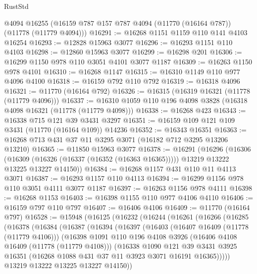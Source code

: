 \begin{lexlean}{RustStd}
\begin{coremodule}
    @4094
    @16255
    (@16159 @787 @157 @787 @4094 (@11770 (@16164 @787)) (@11778 (@11779 @4094)))
@16291 := @16268 @1151 @1159 @110 @141 @4103 @16254
@16293 := @12828 @15963 @3077
@16296 := @16293 @1151 @110 @4103
@16298 := @12860 @15963 @3077
@16299 := @16298 @201
@16306 := @16299 @1150 @978 @110 @3051 @4101 @3077 @1187
@16309 := @16263 @1150 @978 @4101
@16310 := @16268 @1147
@16315 := @16310 @1149 @110 @977 @4096 @4100
@16318 := @16159 @792 @110 @792
@16319 := @16318 @4096
@16321 := @11770 (@16164 @792)
@16326 := @16315 (@16319 @16321 (@11778 (@11779 @4096)))
@16337 := @16310 @1059 @110 @196 @4098 @3828 (@16318 @4098 @16321 (@11778 (@11779 @4098)))
@16338 := @16268 @423
@16343 := @16338 @715 @121 @39 @3431 @3297
@16351 := @16159 @109 @121 @109 @3431 (@11770 (@16164 @109)) @14236
@16352 := @16343 @16351
@16363 := @16268 @713 @431 @37 @11 @3295 @3071 (@16182 @712 @3295 @13206 @13210)
@16365 := @11850 @15963 @3077
@16378 := @16291
    (@16296
      (@16306
        (@16309 (@16326 (@16337 (@16352 (@16363 @16365)))))
        @13219
        @13222
        @13225
        @13227
        @14150))
@16384 := @16268 @1157 @431 @110 @11 @4113 @3071
@16387 := @16293 @1157 @110 @4113
@16394 := @16299 @1156 @978 @110 @3051 @4111 @3077 @1187
@16397 := @16263 @1156 @978 @4111
@16398 := @16268 @1153
@16403 := @16398 @1155 @110 @977 @4106 @4110
@16406 := @16159 @797 @110 @797
@16407 := @16406 @4106
@16409 := @11770 (@16164 @797)
@16528 := @15948
    (@16125
      (@16232
        (@16244
          (@16261
            (@16266
              (@16285
                (@16378
                  (@16384
                    (@16387
                      (@16394
                        (@16397
                          (@16403
                            (@16407 @16409 (@11778 (@11779 @4106)))
                            (@16398
                              @1091
                              @110
                              @196
                              @4108
                              @3926
                              (@16406 @4108 @16409 (@11778 (@11779 @4108)))
                              (@16338
                                @1090
                                @121
                                @39
                                @3431
                                @3925
                                @16351
                                (@16268 @1088 @431 @37 @11 @3923 @3071 @16191 @16365)))))
                        @13219
                        @13222
                        @13225
                        @13227
                        @14150))

\end{coremodule}
\end{lexlean}
